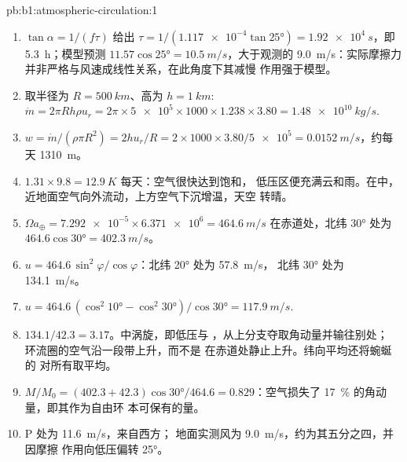 \begin{solution}{pb:b1:atmospheric-circulation:1}
\begin{enumerate}
        则地面风吹向 \ang{65}，来自
        \ang{245}，即西南偏西。
  \item $\tan\alpha = 1/(f\tau)$ 给出 $\tau = 1/(\num{1.117e-4}\tan\ang{25}) =
        \qty{1.92e4}{s}$，即 \qty{5.3}{h}；模型预测 $11.57\cos\ang{25} =
        \qty{10.5}{m/s}$，大于观测的 \qty{9.0}{m/s}：实际摩擦力
        并非严格与风速成线性关系，在此角度下其减慢
        作用强于模型。
  \item 取半径为 $R = \qty{500}{km}$、高为 $h =
        \qty{1}{km}$: $\dot m = 2\pi R h\rho u_r = 2\pi \times \num{5e5} \times 1000
        \times 1.238 \times 3.80 = \qty{1.48e10}{kg/s}$.
  \item $w = \dot m/(\rho\pi R^2) = 2hu_r/R = 2 \times 1000 \times 3.80/\num{5e5} =
        \qty{0.0152}{m/s}$，约每天 \qty{1310}{m}。
  \item $1.31 \times 9.8 = \qty{12.9}{K}$ 每天：空气很快达到饱和，
        低压区便充满云和雨。在中，
        近地面空气向外流动，上方空气下沉增温，天空
        转晴。
  \item $\Omega a_\oplus = \num{7.292e-5} \times \num{6.371e6} = \qty{464.6}{m/s}$
        在赤道处，北纬 \ang{30} 处为 $464.6\cos\ang{30} = \qty{402.3}{m/s}$。
  \item $u = 464.6\,\sin^2\varphi/\cos\varphi$：北纬 \ang{20} 处为 \qty{57.8}{m/s}，
        北纬 \ang{30} 处为 \qty{134.1}{m/s}。
  \item $u = 464.6\,(\cos^2\ang{10} - \cos^2\ang{30})/\cos\ang{30} =
        \qty{117.9}{m/s}$.
  \item $134.1/42.3 = 3.17$。中涡旋，即低压与
        ，从上分支夺取角动量并输往别处；
        环流圈的空气沿一段带上升，而不是
        在赤道处静止上升。纬向平均还将蜿蜒的
        对所有取平均。
  \item $M/M_0 = (402.3 + 42.3)\cos\ang{30}/464.6 = 0.829$：空气损失了
        \qty{17}{\percent} 的角动量，即其作为自由环
        本可保有的量。
  \item P 处为 \qty{11.6}{m/s}，来自西方；
        地面实测风为 \qty{9.0}{m/s}，约为其五分之四，并因摩擦
        作用向低压偏转 \ang{25}。
\end{enumerate}
\end{solution}
